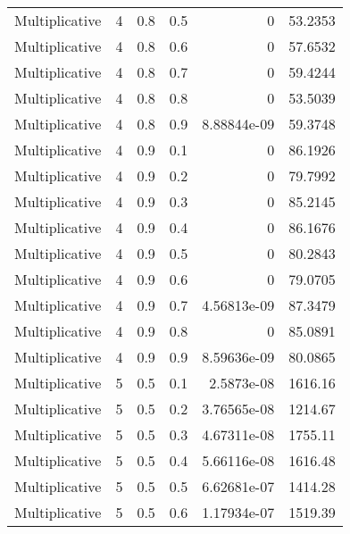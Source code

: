 \documentclass{article}
\begin{document}
\begin{longtable}[H]{lrrrrr}
 Multiplicative &       4 &   0.8 &            0.5 &      0           &         53.2353 \\
 Multiplicative &       4 &   0.8 &            0.6 &      0           &         57.6532 \\
 Multiplicative &       4 &   0.8 &            0.7 &      0           &         59.4244 \\
 Multiplicative &       4 &   0.8 &            0.8 &      0           &         53.5039 \\
 Multiplicative &       4 &   0.8 &            0.9 &      8.88844e-09 &         59.3748 \\
 Multiplicative &       4 &   0.9 &            0.1 &      0           &         86.1926 \\
 Multiplicative &       4 &   0.9 &            0.2 &      0           &         79.7992 \\
 Multiplicative &       4 &   0.9 &            0.3 &      0           &         85.2145 \\
 Multiplicative &       4 &   0.9 &            0.4 &      0           &         86.1676 \\
 Multiplicative &       4 &   0.9 &            0.5 &      0           &         80.2843 \\
 Multiplicative &       4 &   0.9 &            0.6 &      0           &         79.0705 \\
 Multiplicative &       4 &   0.9 &            0.7 &      4.56813e-09 &         87.3479 \\
 Multiplicative &       4 &   0.9 &            0.8 &      0           &         85.0891 \\
 Multiplicative &       4 &   0.9 &            0.9 &      8.59636e-09 &         80.0865 \\
 Multiplicative &       5 &   0.5 &            0.1 &      2.5873e-08  &       1616.16   \\
 Multiplicative &       5 &   0.5 &            0.2 &      3.76565e-08 &       1214.67   \\
 Multiplicative &       5 &   0.5 &            0.3 &      4.67311e-08 &       1755.11   \\
 Multiplicative &       5 &   0.5 &            0.4 &      5.66116e-08 &       1616.48   \\
 Multiplicative &       5 &   0.5 &            0.5 &      6.62681e-07 &       1414.28   \\
 Multiplicative &       5 &   0.5 &            0.6 &      1.17934e-07 &       1519.39   \\

\end{longtable}
\end{document}
